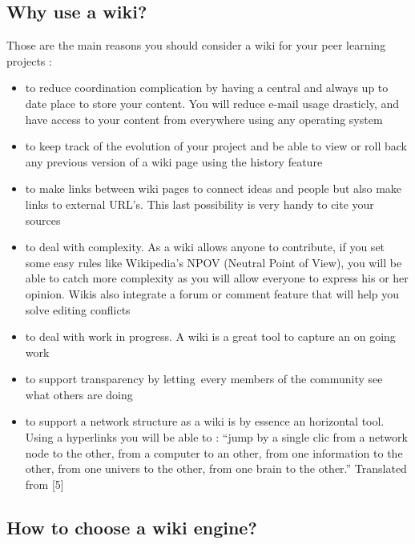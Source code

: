 \subsection{Why use a wiki?}

Those are the main reasons you should consider a wiki for your peer
learning projects :

\begin{itemize}
\item
  to reduce coordination complication by having a central and always up
  to date place to store your content. You will reduce e-mail usage
  drasticly, and have access to your content from everywhere using any
  operating system
\item
  to keep track of the evolution of your project and be able to view or
  roll back any previous version of a wiki page using the history
  feature
\item
  to make links between wiki pages to connect ideas and people but also
  make links to external URL's. This last possibility is very handy to
  cite your sources
\item
  to deal with complexity. As a wiki allows anyone to contribute, if you
  set some easy rules like Wikipedia's NPOV (Neutral Point of View), you
  will be able to catch more complexity as you will allow everyone to
  express his or her opinion. Wikis also integrate a forum or comment
  feature that will help you solve editing conflicts
\item
  to deal with work in progress. A wiki is a great tool to capture an on
  going work
\item
  to support transparency by letting~every members of the community see
  what others are doing
\item
  to support a network structure as a wiki is by essence an horizontal
  tool. Using a hyperlinks you will be able to : ``jump by a single clic
  from a network node to the other, from a computer to an other, from
  one information to the other, from one univers to the other, from one
  brain to the other.'' Translated from {[}5{]}
\end{itemize}

\subsection{How to choose a wiki engine?}

